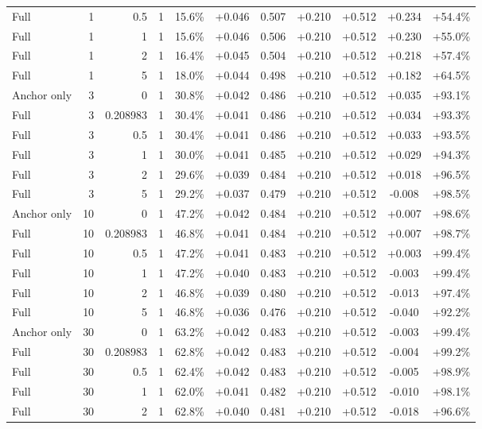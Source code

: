 \begin{table}[htbp]
\begin{tabular}{lrrrccccccc}
Full & 1 & 0.5 & 1 & 15.6\% & +0.046 & 0.507 & +0.210 & +0.512 & +0.234 & +54.4\% \\
Full & 1 & 1 & 1 & 15.6\% & +0.046 & 0.506 & +0.210 & +0.512 & +0.230 & +55.0\% \\
Full & 1 & 2 & 1 & 16.4\% & +0.045 & 0.504 & +0.210 & +0.512 & +0.218 & +57.4\% \\
Full & 1 & 5 & 1 & 18.0\% & +0.044 & 0.498 & +0.210 & +0.512 & +0.182 & +64.5\% \\
Anchor only & 3 & 0 & 1 & 30.8\% & +0.042 & 0.486 & +0.210 & +0.512 & +0.035 & +93.1\% \\
Full & 3 & 0.208983 & 1 & 30.4\% & +0.041 & 0.486 & +0.210 & +0.512 & +0.034 & +93.3\% \\
Full & 3 & 0.5 & 1 & 30.4\% & +0.041 & 0.486 & +0.210 & +0.512 & +0.033 & +93.5\% \\
Full & 3 & 1 & 1 & 30.0\% & +0.041 & 0.485 & +0.210 & +0.512 & +0.029 & +94.3\% \\
Full & 3 & 2 & 1 & 29.6\% & +0.039 & 0.484 & +0.210 & +0.512 & +0.018 & +96.5\% \\
Full & 3 & 5 & 1 & 29.2\% & +0.037 & 0.479 & +0.210 & +0.512 & -0.008 & +98.5\% \\
Anchor only & 10 & 0 & 1 & 47.2\% & +0.042 & 0.484 & +0.210 & +0.512 & +0.007 & +98.6\% \\
Full & 10 & 0.208983 & 1 & 46.8\% & +0.041 & 0.484 & +0.210 & +0.512 & +0.007 & +98.7\% \\
Full & 10 & 0.5 & 1 & 47.2\% & +0.041 & 0.483 & +0.210 & +0.512 & +0.003 & +99.4\% \\
Full & 10 & 1 & 1 & 47.2\% & +0.040 & 0.483 & +0.210 & +0.512 & -0.003 & +99.4\% \\
Full & 10 & 2 & 1 & 46.8\% & +0.039 & 0.480 & +0.210 & +0.512 & -0.013 & +97.4\% \\
Full & 10 & 5 & 1 & 46.8\% & +0.036 & 0.476 & +0.210 & +0.512 & -0.040 & +92.2\% \\
Anchor only & 30 & 0 & 1 & 63.2\% & +0.042 & 0.483 & +0.210 & +0.512 & -0.003 & +99.4\% \\
Full & 30 & 0.208983 & 1 & 62.8\% & +0.042 & 0.483 & +0.210 & +0.512 & -0.004 & +99.2\% \\
Full & 30 & 0.5 & 1 & 62.4\% & +0.042 & 0.483 & +0.210 & +0.512 & -0.005 & +98.9\% \\
Full & 30 & 1 & 1 & 62.0\% & +0.041 & 0.482 & +0.210 & +0.512 & -0.010 & +98.1\% \\
Full & 30 & 2 & 1 & 62.8\% & +0.040 & 0.481 & +0.210 & +0.512 & -0.018 & +96.6\% \\

\end{tabular}
\end{table}
